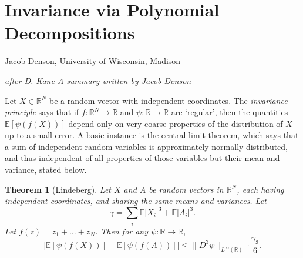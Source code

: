 \documentclass[12pt]{article}
\newtheorem{theorem}{Theorem}
\begin{document}
\section{Invariance via Polynomial Decompositions}

\setcounter{equation}{0}
\setcounter{theorem}{0}

{Jacob Denson,
University of Wisconsin, Madison}

\begin{center}
{\it after D. Kane \cite{Kane}}
{\it A summary written by Jacob Denson}
\end{center}

Let $X \in \mathbb{R}^N$ be a random vector with independent coordinates. The \emph{invariance principle} says that if $f: \mathbb{R}^N \to \mathbb{R}$ and $\psi: \mathbb{R} \to \mathbb{R}$ are `regular', then the quantities $\mathbb{E}[\psi(f(X))]$ depend only on very coarse properties of the distribution of $X$ up to a small error. A basic instance is the central limit theorem, which says that a sum of independent random variables is approximately normally distributed, and thus independent of all properties of those variables but their mean and variance, stated below.

\begin{theorem}[Lindeberg]
    Let $X$ and $A$ be random vectors in $\mathbb{R}^N$, each having independent coordinates, and sharing the same means and variances. Let
    \[ \gamma = \sum_i \mathbb{E} |X_i|^3 + \mathbb{E} |A_i|^3. \]
    Let $f(z) = z_1 + \dots + z_N$. Then for any $\psi: \mathbb{R} \to \mathbb{R}$,
    \[ |\mathbb{E}[\psi(f(X))] - \mathbb{E}[\psi(f(A))]| \leq \| D^3 \psi \|_{L^\infty(\mathbb{R})} \cdot \frac{\gamma_3}{6}. \]
\end{theorem}
\end{document}
